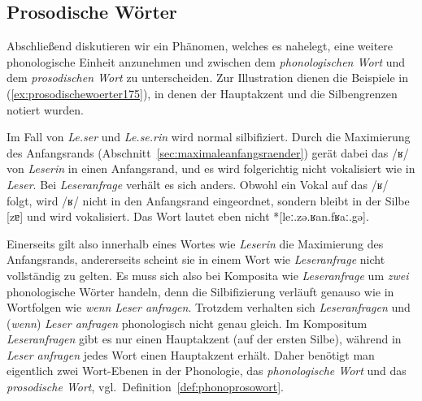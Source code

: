 \subsection{Prosodische Wörter}
\label{sec:prosodischewoerter}

Abschließend diskutieren wir ein Phänomen, welches es nahelegt, eine weitere phonologische Einheit anzunehmen und zwischen dem \textit{phonologischen Wort} und dem \textit{prosodischen Wort} zu unterscheiden.
Zur Illustration dienen die Beispiele in (\ref{ex:prosodischewoerter175}), in denen der Hauptakzent und die Silbengrenzen notiert wurden.

\Stretch[0.25]

\begin{exe}
  \ex\label{ex:prosodischewoerter175}
  \begin{xlist}
  \end{xlist}
\end{exe}

\Stretch[0.25]

Im Fall von \textit{Le.ser} und \textit{Le.se.rin} wird normal silbifiziert.
Durch die Maximierung des Anfangsrands (Abschnitt~\ref{sec:maximaleanfangsraender}) gerät dabei das /ʁ/ von \textit{Leserin} in einen Anfangsrand, und es wird folgerichtig nicht vokalisiert wie in \textit{Leser}.
Bei \textit{Leseranfrage} verhält es sich anders.
Obwohl ein Vokal auf das /ʁ/ folgt, wird /ʁ/ nicht in den Anfangsrand eingeordnet, sondern bleibt in der Silbe [zɐ] und wird vokalisiert.
Das Wort lautet eben nicht *[leː.zə.ʁan.fʁaː.gə].

Einerseits gilt also innerhalb eines Wortes wie \textit{Leserin} die Maximierung des Anfangsrands, andererseits scheint sie in einem Wort wie \textit{Leseranfrage} nicht vollständig zu gelten.
Es muss sich also bei Komposita wie \textit{Leseranfrage} um \textit{zwei} phonologische Wörter handeln, denn die Silbifizierung verläuft genauso wie in Wortfolgen wie \textit{wenn Leser anfragen}.
Trotzdem verhalten sich \textit{Leseranfragen} und (\textit{wenn}) \textit{Leser anfragen} phonologisch nicht genau gleich.
Im Kompositum \textit{Leseranfragen} gibt es nur einen Hauptakzent (auf der ersten Silbe), während in \textit{Leser anfragen} jedes Wort einen Hauptakzent erhält.
Daher benötigt man eigentlich zwei Wort-Ebenen in der Phonologie, das \textit{phonologische Wort} und das \textit{prosodische Wort}, vgl.\ Definition~\ref{def:phonoprosowort}.

